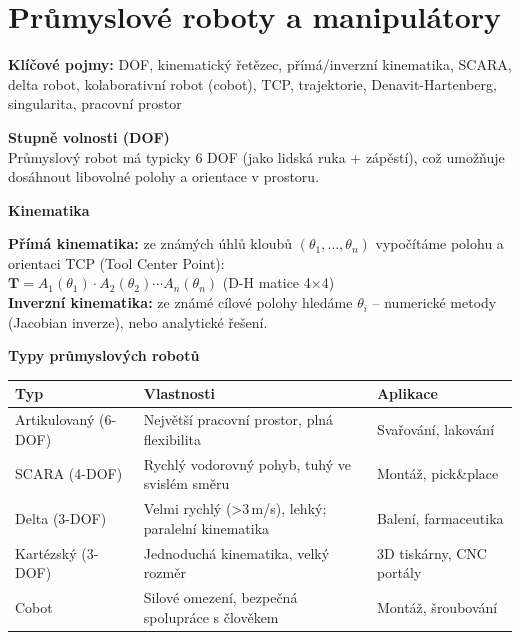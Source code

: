 \documentclass[a4paper,10pt]{article}
\begin{document}
\section{Průmyslové roboty a manipulátory}

\begin{pojmybox}
\textbf{Klíčové pojmy:}
DOF, kinematický řetězec, přímá/inverzní kinematika, SCARA,
delta robot, kolaborativní robot (cobot), TCP, trajektorie,
Denavit-Hartenberg, singularita, pracovní prostor
\end{pojmybox}

\begin{vysvetlenibox}
\textbf{Stupně volnosti (DOF)}\\
Průmyslový robot má typicky 6 DOF (jako lidská ruka + zápěstí),
což umožňuje dosáhnout libovolné polohy a orientace v prostoru.

\textbf{Kinematika}

\begin{vzorcebox}
\textbf{Přímá kinematika:} ze známých úhlů kloubů $(\theta_1,\ldots,\theta_n)$
vypočítáme polohu a orientaci TCP (Tool Center Point):\\
$\mathbf{T} = A_1(\theta_1) \cdot A_2(\theta_2) \cdots A_n(\theta_n)$
\quad (D-H matice 4×4)\\[4pt]
\textbf{Inverzní kinematika:} ze známé cílové polohy hledáme $\theta_i$ --
numerické metody (Jacobian inverze), nebo analytické řešení.
\end{vzorcebox}

\textbf{Typy průmyslových robotů}

\begin{center}
\begin{tabularx}{0.95\linewidth}{@{} l X l @{}}
    \toprule
    \textbf{Typ} & \textbf{Vlastnosti} & \textbf{Aplikace} \\
    \midrule
    Artikulovaný (6-DOF) & Největší pracovní prostor, plná flexibilita
                         & Svařování, lakování \\
    SCARA (4-DOF)        & Rychlý vodorovný pohyb, tuhý ve svislém směru
                         & Montáž, pick\&place \\
    Delta (3-DOF)        & Velmi rychlý (\textgreater3\,m/s), lehký; paralelní kinematika
                         & Balení, farmaceutika \\
    Kartézský (3-DOF)    & Jednoduchá kinematika, velký rozměr
                         & 3D tiskárny, CNC portály \\
    Cobot                & Silové omezení, bezpečná spolupráce s člověkem
                         & Montáž, šroubování \\
    \bottomrule
\end{tabularx}
\end{center}


\end{vysvetlenibox}
\end{document}
